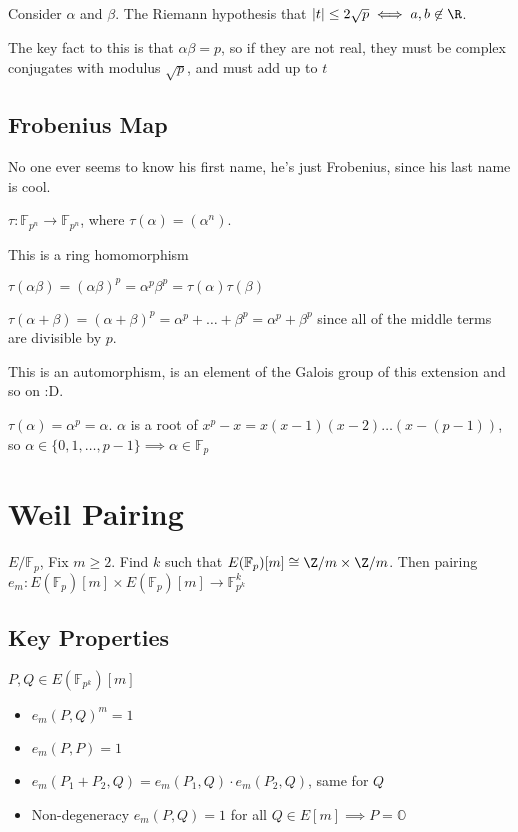 \documentclass[twoside, 10pt]{article}
\newcommand{\F}{\mathbb{F}}
\renewcommand{\O}{\mathbb{O}}
\begin{document}
\begin{rmk}
Consider $\alpha$ and $\beta$. The Riemann hypothesis that $|t| \leq 2\sqrt{p} \iff a, b \not\in \R$. 
\end{rmk}
The key fact to this is that $\alpha \beta = p$, so if they are not real, they must be complex conjugates with modulus $\sqrt{p}$, and must add up to $t$

\subsection{Frobenius Map} No one ever seems to know his first name, he's just Frobenius, since his last name is cool.

\begin{defn}
    $\tau : \F_{p^n} \to \F_{p^n}$, where $\tau(\alpha) = (\alpha^n)$. 
\end{defn}

\begin{lem}
    This is a ring homomorphism
\end{lem}
$\tau(\alpha\beta) = (\alpha\beta)^p = \alpha^p\beta^p = \tau(\alpha)\tau(\beta)$

$\tau(\alpha + \beta) = (\alpha + \beta)^p = \alpha^p + \ldots + \beta^p = \alpha^p + \beta^p$ since all of the middle terms are divisible by $p$.

This is an automorphism, is an element of the Galois group of this extension and so on :D.

\begin{rmk}
    $\tau(\alpha)=\alpha^p = \alpha$. $\alpha$ is a root of $x^p - x= x(x - 1)(x -2)\ldots(x - (p-1))$, so $\alpha \in \{0, 1, \ldots, p-1\} \implies \alpha \in \F_p$
\end{rmk}

\section{Weil Pairing} 
$E/\F_p$, Fix $m \geq 2$. Find $k$ such that $E(\F_p)[m] \cong \Z/m \times \Z/m$. Then pairing $e_m : E(\F_p)[m] \times E(\F_p)[m] \to \F_{p^k}^k$

\subsection{Key Properties}
$P, Q \in E(\F_{p^k})[m]$

\begin{itemize}
    \item $e_m(P, Q)^m = 1$
    \item $e_m(P, P) = 1$
    \item $e_m(P_1 + P_2, Q) = e_m(P_1, Q) \cdot e_m(P_2, Q)$, same for $Q$
    \item Non-degeneracy $e_m(P, Q) = 1$ for all $Q \in E[m] \implies P = \O$
\end{itemize}
\end{document}
